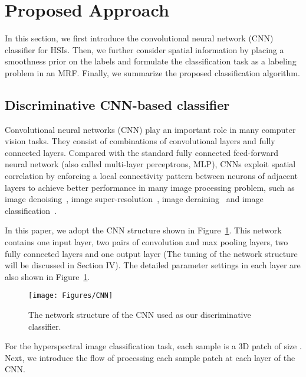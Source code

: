 \documentclass[journal]{IEEEtran}
\begin{document}
	\section{Proposed Approach}
	In this section, we first introduce the convolutional neural network (CNN) classifier for HSIs. Then, we further consider spatial information by placing a smoothness prior on the labels  and formulate the {{classification task}} as a labeling problem in an MRF. {{Finally, we summarize the proposed classification algorithm.}}
	
	\subsection{Discriminative CNN-based classifier}
	Convolutional neural networks (CNN) {{play an important role in many computer vision tasks.}} They consist of combinations of convolutional layers and fully connected layers. Compared with the standard fully connected feed-forward neural network (also called multi-layer perceptrons, MLP), CNNs exploit spatial correlation by enforcing a local connectivity pattern between neurons of adjacent layers to achieve better performance in many image processing problem, such as image denoising~\cite{xie2012image}, image super-resolution~\cite{dong2016image}, image deraining~\cite{fu2017clearing} and image classification~\cite{krizhevsky2012imagenet}.
	
	In this paper, we adopt the CNN structure shown in Figure~\ref{CNN}. This network contains one input layer, two pairs of convolution and max pooling layers, two fully connected layers and one output layer ({{The tuning of the network structure will be discussed in Section IV}}). The detailed parameter settings in each layer are also shown in Figure~\ref{CNN}.
	\begin{figure}
		\centering
		\texttt{[image: Figures/CNN]}
		\caption{The network structure of the CNN used as our discriminative classifier.}\label{CNN}
	\end{figure}
	For the hyperspectral image classification task, each sample is a 3D patch of size . Next, we introduce the flow of processing each sample patch  at each layer of the CNN.
	
\end{document}
